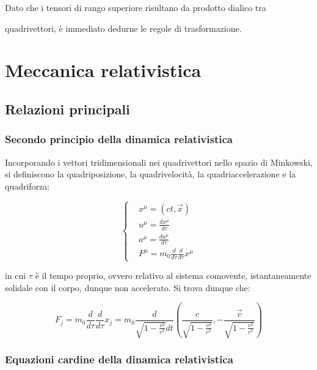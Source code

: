 \documentclass{article}
\begin{document}
Dato che i tensori di rango superiore risultano da prodotto dialico tra

quadrivettori, è immediato dedurne le regole di trasformazione.



\section{Meccanica relativistica}

\subsection{Relazioni principali}

\subsubsection{Secondo principio della dinamica relativistica}
Incorporando i vettori tridimensionali nei quadrivettori nello spazio di Minkowski,
si definiscono la quadriposizione, la quadrivelocità, la quadriaccelerazione e la quadriforza:

\begin{equation}
    \left\{
    \begin{aligned}
         & x^\mu = (ct, \vec{x})                          \\
         & u^\mu = \frac{dx^\mu}{d\tau}                   \\
         & a^\mu = \frac{du^\mu}{d\tau}                   \\
         & F^\mu = m_0\frac{d}{d\tau}\frac{d}{d\tau}x^\mu
    \end{aligned}
    \right.
\end{equation}

in cui $\tau$ è il tempo proprio, ovvero relativo al sistema comovente, istantaneamente solidale con il corpo, dunque non accelerato.
Si trova dunque che:

\begin{equation}
    F_j=m_0\frac{d}{d\tau}\frac{d}{d\tau}x_j=m_0\frac{d}{\sqrt{1-\frac{v^2}{c^2}}dt}(\frac{c}{\sqrt{1-\frac{v^2}{c^2}}},-\frac{\vec{v}}{\sqrt{1-\frac{v^2}{c^2}}})
\end{equation}

\subsubsection{Equazioni cardine della dinamica relativistica}
\end{document}
